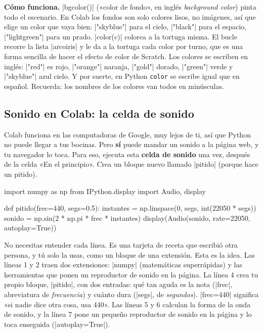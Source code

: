 \textbf{Cómo funciona.} \py|bgcolor()| («color de fondo», en inglés \emph{background color}) pinta todo el escenario. En Colab los fondos son solo colores lisos, no imágenes, así que elige un color que vaya bien: \py|"skyblue"| para el cielo, \py|"black"| para el espacio, \py|"lightgreen"| para un prado. \py|color(c)| colorea a la tortuga misma. El bucle recorre la lista \py|arcoiris| y le da a la tortuga cada color por turno, que es una forma sencilla de hacer el efecto de color de Scratch. Los colores se escriben en inglés: \py|"red"| es rojo, \py|"orange"| naranja, \py|"gold"| dorado, \py|"green"| verde y \py|"skyblue"| azul cielo. Y por suerte, en Python \texttt{color} se escribe igual que en español. Recuerda: los nombres de los colores van todos en minúsculas.

\subsection*{Sonido en Colab: la celda de sonido}

Colab funciona en las computadoras de Google, muy lejos de ti, así que Python no puede llegar a tus bocinas. Pero \textbf{sí} puede mandar un sonido a la página web, y tu navegador lo toca. Para eso, ejecuta esta \textbf{celda de sonido} una vez, después de la celda «En el principio». Crea un bloque nuevo llamado \py|pitido| (porque hace un pitido).

\begin{typethis}
import numpy as np
from IPython.display import Audio, display

def pitido(frec=440, segs=0.5):
    instantes = np.linspace(0, segs, int(22050 * segs))
    sonido = np.sin(2 * np.pi * frec * instantes)
    display(Audio(sonido, rate=22050, autoplay=True))
\end{typethis}

No necesitas entender cada línea. Es una tarjeta de receta que escribió otra persona, y tú solo la usas, como un bloque de una extensión. Esta es la idea. Las líneas 1 y 2 traen dos extensiones: \py|numpy| (matemáticas superrápidas) y las herramientas que ponen un reproductor de sonido en la página. La línea 4 crea tu propio bloque, \py|pitido|, con dos entradas: qué tan aguda es la nota (\py|frec|, abreviatura de \emph{frecuencia}) y cuánto dura (\py|segs|, de \emph{segundos}). \py|frec=440| significa «si nadie dice otra cosa, usa 440». Las líneas 5 y 6 calculan la forma de la onda de sonido, y la línea 7 pone un pequeño reproductor de sonido en la página y lo toca enseguida (\py|autoplay=True|).


